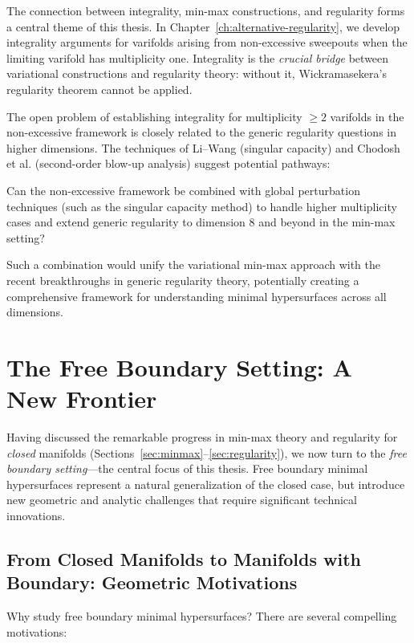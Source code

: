 The connection between integrality, min-max constructions, and regularity forms a central theme of
this thesis. In Chapter~\ref{ch:alternative-regularity}, we develop integrality arguments for varifolds
arising from non-excessive sweepouts when the limiting varifold has multiplicity one. Integrality
is the \emph{crucial bridge} between variational constructions and regularity theory: without it,
Wickramasekera's regularity theorem \cite{Wic14} cannot be applied.

The open problem of establishing integrality for multiplicity $\geq 2$ varifolds in the
non-excessive framework is closely related to the generic regularity questions in higher dimensions.
The techniques of Li--Wang (singular capacity) and Chodosh et al. (second-order blow-up analysis)
suggest potential pathways:

\begin{question}
Can the non-excessive framework be combined with global perturbation techniques (such as the
singular capacity method) to handle higher multiplicity cases and extend generic regularity to
dimension $8$ and beyond in the min-max setting?
\end{question}

Such a combination would unify the variational min-max approach with the recent breakthroughs in
generic regularity theory, potentially creating a comprehensive framework for understanding minimal
hypersurfaces across all dimensions.

\section{The Free Boundary Setting: A New Frontier}\label{sec:free-bdry}

Having discussed the remarkable progress in min-max theory and regularity for \emph{closed}
manifolds (Sections~\ref{sec:minmax}--\ref{sec:regularity}), we now turn to the \emph{free
boundary setting}---the central focus of this thesis. Free boundary minimal hypersurfaces represent
a natural generalization of the closed case, but introduce new geometric and analytic challenges
that require significant technical innovations.

\subsection{From Closed Manifolds to Manifolds with Boundary: Geometric Motivations}

Why study free boundary minimal hypersurfaces? There are several compelling motivations:


